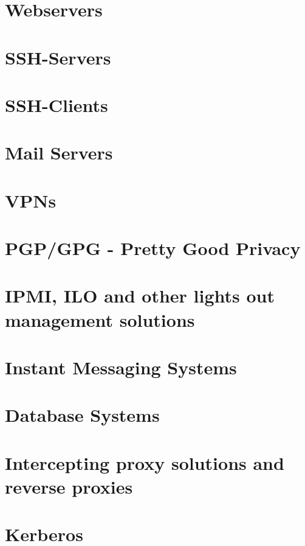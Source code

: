 \section{Webservers}
\label{sec:webservers}

\section{SSH-Servers}
\label{sec:sshservers}

\section{SSH-Clients}
\label{sec:sshclients}

\section{Mail Servers}
\label{sec:mail-servers}

\section{VPNs}
\label{sec:vpns}

\section{PGP/GPG - Pretty Good Privacy}
\label{sec:pgpgpg-pretty-good}

%
\section{IPMI, ILO and other lights out management solutions}
\label{sec:ipmi-ilo-other}

\section{Instant Messaging Systems}
\label{sec:inst-mess-syst}

\section{Database Systems}
\label{sec:database-systems}

\section{Intercepting proxy solutions and reverse proxies}
\label{sec:interc-proxy-solut}

\section{Kerberos}
\label{sec:kerberos}


